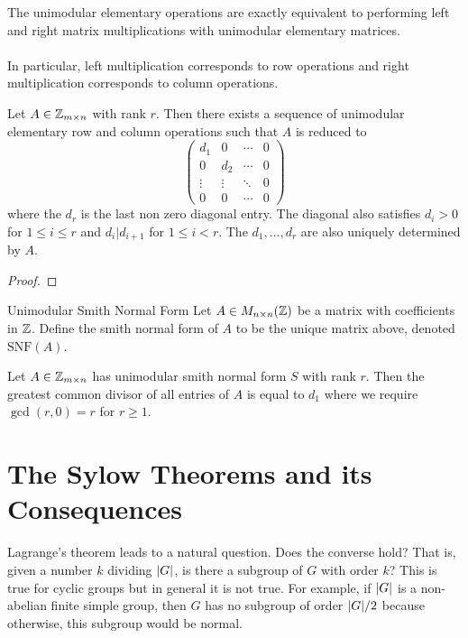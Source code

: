 \documentclass[a4paper]{article}
\begin{document}
\begin{prp}{}{} The unimodular elementary operations are exactly equivalent to performing left and right matrix multiplications with unimodular elementary matrices. \\~\\
In particular, left multiplication corresponds to row operations and right multiplication corresponds to column operations. 
\end{prp}

\begin{thm}{}{} Let $A\in\mathbb{Z}_{m\times n}$ with rank $r$. Then there exists a sequence of unimodular elementary row and column operations such that $A$ is reduced to $$\begin{pmatrix}
d_1 & 0 & \cdots & 0\\
0 & d_2 & \cdots & 0\\
\vdots & \vdots & \ddots & 0\\
0 & 0 & \cdots & 0
\end{pmatrix}$$ where the $d_r$ is the last non zero diagonal entry. The diagonal also satisfies $d_i>0$ for $1\leq i\leq r$ and $d_i|d_{i+1}$ for $1\leq i<r$. The $d_1,\dots,d_r$ are also uniquely determined by $A$. \tcbline
\begin{proof}
\end{proof}
\end{thm}

\begin{defn}{Unimodular Smith Normal Form}{} Let $A\in M_{n\times n}(\mathbb{Z})$ be a matrix with coefficients in $\mathbb{Z}$. Define the smith normal form of $A$ to be the unique matrix above, denoted $\text{SNF}(A)$. 
\end{defn}

\begin{lmm}{}{} Let $A\in\mathbb{Z}_{m\times n}$ has unimodular smith normal form $S$ with rank $r$. Then the greatest common divisor of all entries of $A$ is equal to $d_1$ where we require $\gcd(r,0)=r$ for $r\geq 1$. 
\end{lmm}

\pagebreak
\section{The Sylow Theorems and its Consequences}
Lagrange's theorem leads to a natural question. Does the converse hold? That is, given a number $k$ dividing $\abs{G}$, is there a subgroup of $G$ with order $k$? This is true for cyclic groups but in general it is not true. For example, if $\abs{G}$ is a non-abelian finite simple group, then $G$ has no subgroup of order $\abs{G}/2$ because otherwise, this subgroup would be normal. \\~\\
\end{document}
